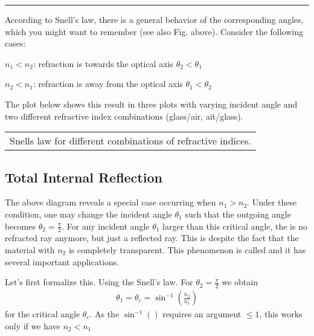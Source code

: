 \documentclass[letterpaper,10pt,english]{sphinxmanual}
\begin{document}
\bigskip\hrule\bigskip


According to Snell’s law, there is a general behavior of the corresponding angles, which you might want to remember (see also Fig. above). Consider the following cases:

\(n_1<n_2\): \sphinxhyphen{} refraction is towards the optical axis \sphinxhyphen{} \(\theta_2<\theta_1\)

\(n_2<n_1\): \sphinxhyphen{} refraction is away from the optical axis \sphinxhyphen{} \(\theta_1<\theta_2\)

The plot below shows this result in three plots with varying incident angle and two different refractive index combinations (glass/air, ait/glass).


\begin{savenotes}\sphinxattablestart
\centering
\begin{tabulary}{\linewidth}[t]{|T|}
\hline
\sphinxstyletheadfamily 
{}
\\
\hline
{} Snells law for different combinations of refractive indices.
\\
\hline
\end{tabulary}
\par
\sphinxattableend\end{savenotes}


\subsection{Total Internal Reflection}
\label{\detokenize{notebooks/L1/Refraction:Total-Internal-Reflection}}
The above diagram reveals a special case occurring when \(n_1>n_2\). Under these condition, one may change the incident angle \(\theta_1\) such that the outgoing angle becomes \(\theta_2=\frac{\pi}{2}\). For any incident angle \(\theta_1\) larger than this critical angle, the is no refracted ray anymore, but just a reflected ray. This is despite the fact that the material with \(n_2\) is completely transparent. This phenomenon is called  and it
has several important applications.

Let’s first formalize this. Using the Snell’s law. For \(\theta_2=\frac{\pi}{2}\) we obtain
\begin{equation*}
\begin{split}\theta_1=\theta_c=\sin^{-1}\left (\frac{n_2}{n_1}\right )\end{split}
\end{equation*}
for the critical angle \(\theta_c\). As the \(\sin^{-1}()\) requires an argument \(\le1\), this works only if we have \(n_2 < n_1\)
\end{document}
